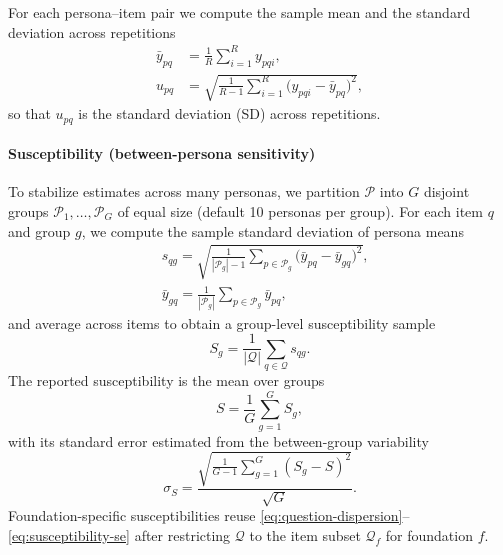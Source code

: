 \documentclass{article}
\begin{document}
For each persona--item pair we compute the sample mean and the standard deviation across repetitions
\begin{align}
  \bar{y}_{pq} &= \frac{1}{R} \sum_{i=1}^{R} y_{pqi}, \label{eq:persona-question-mean}\\
  u_{pq} &= \sqrt{\frac{1}{R-1} \sum_{i=1}^{R} \big(y_{pqi} - \bar{y}_{pq}\big)^2}, \label{eq:persona-question-se}
\end{align}
so that \(u_{pq}\) is the standard deviation (SD) across repetitions.

\paragraph{Susceptibility (between-persona sensitivity)} To stabilize estimates across many personas, we partition \(\mathcal{P}\) into \(G\) disjoint groups \(\mathcal{P}_1,\ldots,\mathcal{P}_G\) of equal size (default 10 personas per group). For each item \(q\) and group \(g\), we compute the sample standard deviation of persona means
\begin{align}
  & s_{qg} = \sqrt{\frac{1}{|\mathcal{P}_g|-1} \sum_{p \in \mathcal{P}_g} \Big(\bar{y}_{pq} - \bar{y}_{gq}\Big)^2},\\
  & \bar{y}_{gq} = \frac{1}{|\mathcal{P}_g|} \sum_{p \in \mathcal{P}_g} \bar{y}_{pq},
  \label{eq:question-dispersion}
\end{align}
and average across items to obtain a group-level susceptibility sample
\begin{equation}
  S_g = \frac{1}{|\mathcal{Q}|} \sum_{q \in \mathcal{Q}} s_{qg}.\label{eq:group-susceptibility}
\end{equation}
The reported susceptibility is the mean over groups
\begin{equation}
  S = \frac{1}{G} \sum_{g=1}^{G} S_g,\label{eq:overall-susceptibility}
\end{equation}
with its standard error estimated from the between-group variability
\begin{equation}
  \sigma_S = \frac{\sqrt{\frac{1}{G-1} \sum_{g=1}^{G} (S_g - S)^2}}{\sqrt{G}}.\label{eq:susceptibility-se}
\end{equation}
Foundation-specific susceptibilities reuse \eqref{eq:question-dispersion}--\eqref{eq:susceptibility-se} after restricting \(\mathcal{Q}\) to the item subset \(\mathcal{Q}_f\) for foundation \(f\).
\end{document}
